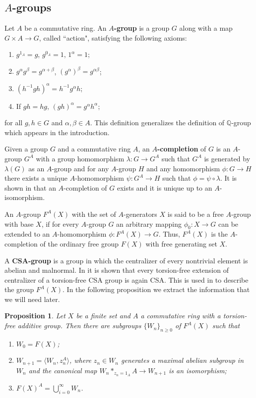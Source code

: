 \documentclass[11pt]{amsart}
\newtheorem{pro}[lem]{Proposition}
\numberwithin{claimcounter}{lem}
\newcommand{\Q}{\mathbb{Q}}
\begin{document}
 \subsection{$A$-groups}
 Let $A$ be a commutative ring. An {\bf $A$-group} is a group $G$ along with a map $G\times A\to G$, called ``action",  satisfying the following axioms:
 \begin{enumerate}
\item [(a)] $g^{1_A}=g$, $g^{0_A}=1$, $1^\alpha=1$;
\item [(b)] $g^{\alpha}g^{\beta}=g^{\alpha+\beta}$, $(g^\alpha)^\beta=g^{\alpha\beta}$;
\item [(c)] $(h^{-1}gh)^{\alpha}=h^{-1}g^{\alpha} h$;
\item [(d)] If $gh=hg$, $(gh)^{\alpha}=g^{\alpha}h^{\alpha}$;
  \end{enumerate}
for all $g,h\in G$ and $\alpha, \beta\in A$.  
  This definition generalizes the definition of $\Q$-group which appears in the introduction.
  
  Given a group $G$ and a commutative ring $A$, an {\bf $A$-completion} of $G$ is an $A$-group $G^A$ with a group homomorphism $\lambda: G\to G^A$ such that $G^A$ is generated by $\lambda(G)$ as an $A$-group and for any $A$-group $H$ and any homomorphism $\phi:G\to H$ there exists a unique $A$-homomorphism $\psi:G^A\to H$ such that $\phi=\psi\circ \lambda$. It is shown in  \cite[Theorems 1 and 2]{MR94} that an $A$-completion of $G$ exists and it is unique up to an $A$-isomorphism.
    
  An $A$-group $F^A(X)$ with the  set of $A$-generators $X$  is said to be a free $A$-group with base $X$, 
  if for every $A$-group $G$ an arbitrary mapping $\phi_0: X\to G$ can be extended to an $A$-homomorphism $\phi: F^A(X)\to G$.    Thus, $F^A(X)$  is the
$A$-completion of the ordinary free group $F(X)$ with free generating set $X$.  

A {\bf CSA-group} is a group in which the centralizer of every nontrivial element is abelian and malnormal. In \cite[Theorem 5]{MR96} it is shown that every torsion-free extension of centralizer of a torsion-free CSA group is again CSA. This is used  in \cite[Theorem 8]{MR96} to describe the group $F^A(X)$. In the following proposition we extract the information that we will need later.  
  \begin{pro}\label{MR}   Let $X$ be a finite set and $A$ a commutative ring  with a torsion-free additive group.  Then there are subgroups $\{W_n\}_{n\ge 0}$ of  $F^A(X)$  such that 
  \begin{enumerate}
 \item[(a)] $W_0=F(X)$;
  \item[(b)]   $W_{n+1}=\langle W_n, z_n^A\rangle$, where   $z_n\in W_n$ generates a maximal abelian subgroup in $W_n$
 and the canonical map $\displaystyle W_n*_{z_n=1_A}  A\to W_{n+1}$ is an isomorphism;
 \item[(c)]  $F(X)^A=\bigcup_{i=0}^\infty W_n$.
 \end{enumerate}
\end{pro}
 
\end{document}
